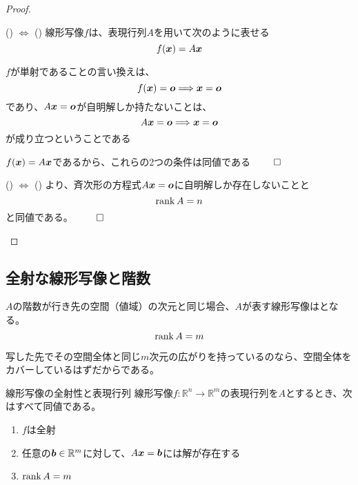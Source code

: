 \documentclass[../../../topic_linear-algebra]{subfiles}
\begin{document}
\begin{proof}
  \begin{subpattern}{() $\Longleftrightarrow$ ()}
    線形写像$f$は、表現行列$A$を用いて次のように表せる
    \begin{equation*}
      f(\vb*{x}) = A\vb*{x}
    \end{equation*}

    $f$が単射であることの言い換えは、
    \begin{equation*}
      f(\vb*{x}) = \vb*{o} \Longrightarrow \vb*{x} = \vb*{o}
    \end{equation*}
    であり、$A\vb*{x} = \vb*{o}$が自明解しか持たないことは、
    \begin{equation*}
      A\vb*{x} = \vb*{o} \Longrightarrow \vb*{x} = \vb*{o}
    \end{equation*}
    が成り立つということである

    $f(\vb*{x}) = A\vb*{x}$であるから、これらの2つの条件は同値である $\qed$
  \end{subpattern}

  \begin{subpattern}{() $\Longleftrightarrow$ ()}
    より、斉次形の方程式$A\vb*{x} = \vb*{o}$に自明解しか存在しないことと
    \begin{equation*}
      \rank A = n
    \end{equation*}
    と同値である。 $\qed$
  \end{subpattern}
\end{proof}

\subsection{全射な線形写像と階数}

$A$の階数が行き先の空間（値域）の次元と同じ場合、$A$が表す線形写像はとなる。
\begin{equation*}
  \rank A = m
\end{equation*}

写した先でその空間全体と同じ$m$次元の広がりを持っているのなら、空間全体をカバーしているはずだからである。

\begin{theorem*}{線形写像の全射性と表現行列}
  線形写像$f\colon \mathbb{R}^n \to \mathbb{R}^m$の表現行列を$A$とするとき、次はすべて同値である。
  \begin{enumerate}[label=\romanlabel]
    \item $f$は全射
    \item 任意の$\vb*{b} \in \mathbb{R}^m$に対して、$A\vb*{x} = \vb*{b}$には解が存在する
    \item $\rank A = m$
  \end{enumerate}
\end{theorem*}
\end{document}
